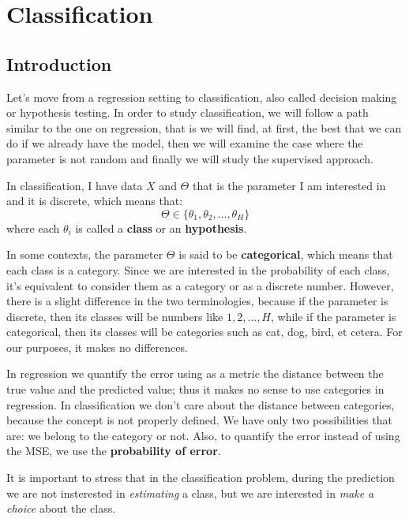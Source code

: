 \chapter{Classification}

\section{Introduction}
Let's move from a regression setting to classification, also called decision making or hypothesis testing. In order to study classification, we will follow a path similar to the one on regression, that is we will find, at first, the best that we can do if we already have the model, then we will examine the case where the parameter is not random and finally we will study the supervised approach.

In classification, I have data $X$ and $\Theta$ that is the parameter I am interested in and it is discrete, which means that:
\[
    \Theta \in \{\theta_1, \theta_2, \dots, \theta_H\}
\]
where each $\theta_i$ is called a \textbf{class} or an \textbf{hypothesis}.

In some contexts, the parameter $\Theta$ is said to be \textbf{categorical}, which means that each class is a category. Since we are interested in the probability of each class, it's equivalent to consider them as a category or as a discrete number. However, there is a slight difference in the two terminologies, because if the parameter is discrete, then its classes will be numbers like $1, 2, \dots, H$, while if the parameter is categorical, then its classes will be categories such as cat, dog, bird, et cetera. For our purposes, it makes no differences.

In regression we quantify the error using as a metric the distance between the true value and the predicted value; thus it makes no sense to use categories in regression. In classification we don't care about the distance between categories, because the concept is not properly defined. We have only two possibilities that are: we belong to the category or not. Also, to quantify the error instead of using the MSE, we use the \textbf{probability of error}.

It is important to stress that in the classification problem, during the prediction we are not insterested in \textit{estimating} a class, but we are interested in \textit{make a choice} about the class.


